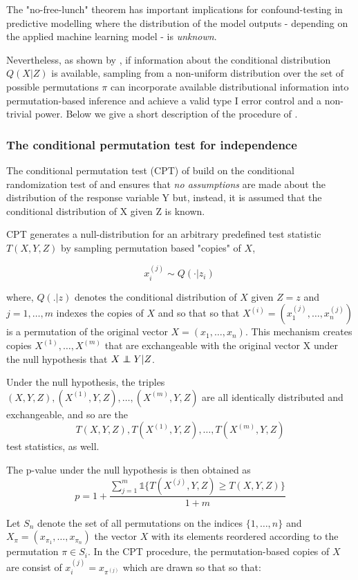 \documentclass{article}
\theoremstyle{definition}
\newcommand\independent{\protect\mathpalette{\protect\independenT}{\perp}}
\def\independenT#1#2{\mathrel{\rlap{$#1#2$}\mkern2mu{#1#2}}}
\begin{document}
The "no-free-lunch" theorem has important implications for confound-testing in predictive modelling where the distribution of the model outputs - depending on the applied machine learning model - is \emph{unknown}.

Nevertheless, as shown by \cite{berrett2020conditional}, if information about the conditional distribution $Q(X|Z)$ is available, sampling from a non-uniform distribution over the set of possible permutations $\pi$ can incorporate available distributional information into permutation-based inference and achieve a valid type I error control and a non-trivial power.
Below we give a short description of the procedure of \cite{berrett2020conditional}.

\subsubsection*{The conditional permutation test for independence}

The conditional permutation test (CPT) of \cite{berrett2020conditional} build on the conditional randomization test of \cite{candes2016panning} and ensures that \emph{no assumptions} are made about the distribution of the response variable Y but, instead, it is assumed that the conditional distribution of X given Z is known.

CPT generates a null-distribution for an arbitrary predefined test statistic $T(X,Y,Z)$ by sampling permutation based "copies" of $X$,

$$x_i^{(j)} \sim Q(\cdot|z_i) \ $$

where, $Q(.|z)$ denotes the conditional distribution of $X$ given $Z=z$ and $j=1,\dots, m$ indexes the copies of $X$ and so that so that $X^{(i)} = (x_1^{(j)}, \dots, x_n^{(j)})$ is a permutation of the original vector $X = (x_1, \dots, x_n)$. This mechanism creates copies $X^{(1)}, \dots ,X^{(m)}$ that are exchangeable with the original vector X under the null hypothesis that $X \independent Y | Z$.

Under the null hypothesis, the triples $(X,Y,Z), (X^{(1)},Y,Z),\dots,(X^{(m)},Y,Z)$ are all identically distributed and exchangeable, and so are the 
$$T(X,Y,Z), T(X^{(1)},Y,Z),\dots,T(X^{(m)},Y,Z)$$
test statistics, as well.

The p-value under the null hypothesis is then obtained as
$$ p= 1+\frac{\sum_{j=1}^m \mathbb{1} \{T(X^{(j)},Y,Z) \geq T(X,Y,Z) \}  }{1+m}$$

Let $S_n$ denote the set of all permutations on the indices $\{1,\dots,n\}$ and $X_\pi = (x_{\pi_1}, \dots, x_{\pi_n})$ the vector $X$ with its elements reordered according to the permutation $\pi \in S_i$.
In the CPT procedure, the permutation-based copies of $X$ are consist of $x_i^{(j)} = x_{\pi^{(j)}}$ which are drawn so that 
so that:
\end{document}

